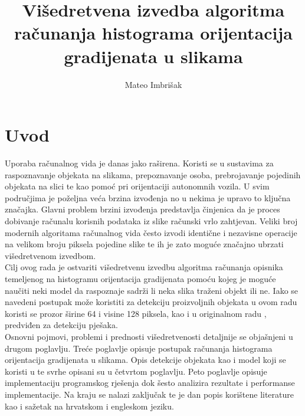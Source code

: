 \documentclass[times, utf8, zavrsni]{fer}
\begin{document}

\title{Višedretvena izvedba algoritma računanja histograma orijentacija gradijenata u slikama}

\author{Mateo Imbrišak}

\maketitle

\zahvala{}

\tableofcontents

\chapter{Uvod}
Uporaba računalnog vida je danas jako raširena. Koristi se u sustavima za raspoznavanje objekata na slikama, prepoznavanje osoba, prebrojavanje pojedinih objekata na slici te kao pomoć pri orijentaciji autonomnih vozila. U svim područjima je poželjna veća brzina izvođenja no u nekima je upravo to ključna značajka. Glavni problem brzini izvođenja predstavlja činjenica da je proces dobivanje računalu korisnih podataka iz slike računski vrlo zahtjevan. Veliki broj modernih algoritama računalnog vida često izvodi identične i nezavisne operacije na velikom broju piksela pojedine slike te ih je zato moguće značajno ubrzati višedretvenom izvedbom. \\

Cilj ovog rada je ostvariti višedretvenu izvedbu algoritma računanja opisnika temeljenog na histogramu orijentacija gradijenata pomoću kojeg je moguće naučiti neki model da raspoznaje sadrži li neka slika traženi objekt ili ne. Iako se navedeni postupak može koristiti za detekciju proizvoljnih objekata u ovom radu koristi se prozor širine 64 i visine 128 piksela, kao i u originalnom radu \citep{dalal2005histograms}, predviđen za detekciju pješaka. \\

Osnovni pojmovi, problemi i prednosti višedretvenosti detaljnije se objašnjeni u drugom poglavlju. Treće poglavlje opisuje postupak računanja histograma orijentacija gradijenata u slikama. Opis detekcije objekata kao i model koji se koristi u te svrhe opisani su u četvrtom poglavlju. Peto poglavlje opisuje implementaciju programskog rješenja dok šesto analizira rezultate i performanse implementacije. Na kraju se nalazi zaključak te je dan popis korištene literature kao i sažetak na hrvatskom i engleskom jeziku.
\end{document}
